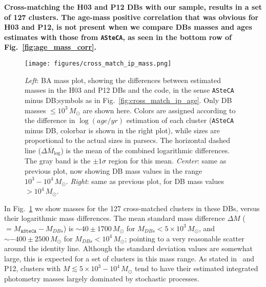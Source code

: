\documentclass{aa}
\begin{document}
\textbf{Cross-matching the H03 and P12 DBs with our sample, results in a
set of 127 clusters. The age-mass positive correlation that was obvious for H03
and P12, is not present when we compare DBs masses and ages estimates with
those from \texttt{ASteCA}, as seen in the bottom row of
Fig.~\ref{fig:age_mass_corr}.}
%
\begin{figure*}
\texttt{[image: figures/cross\_match\_ip\_mass.png]}
\caption{\emph{Left}: BA mass plot, showing the differences between estimated
masses in the H03 and P12 DBs and the code, in the sense \texttt{ASteCA} minus
DB;\@ symbols as in Fig.~\ref{fig:cross_match_ip_age}.
Only DB masses ${\le}10^3\,M_{\odot}$ are shown here.
Colors are assigned according to the difference in $\log(age/yr)$ estimation of
each cluster (\texttt{ASteCA} minus DB, colorbar is shown in the right plot),
while sizes are proportional to the actual sizes in parsecs.
The horizontal dashed line ($\overline{\Delta M_{\log}}$) is the mean of the
combined logarithmic differences. The gray band is the ${\pm}1\sigma$ region for
this mean.
\emph{Center}: same as previous plot, now showing DB mass values in the range
$10^3-10^4\,M_{\odot}$.
\emph{Right}: same as previous plot, for DB mass values ${>}10^4\,M_{\odot}$.
}
\label{fig:cross_match_ip_mass}
\end{figure*}
%
In Fig.~\ref{fig:cross_match_ip_mass} we show masses for the 127 cross-matched
clusters in these DBs, versus their logarithmic mass differences.
%
The mean standard mass difference $\Delta M$ (${=}M_{\mathtt{ASteCA}}-M_{DBs}$)
is ${\sim}40{\pm}1700\,M_{\odot}$ for $M_{DBs} {<}5{\times}10^3\,M_{\odot}$,
and ${\sim-}400{\pm}2500\,M_{\odot}$ for $M_{DBs} {<}10^4\,M_{\odot}$; pointing
to a very reasonable scatter around the identity line.
%
Although the standard deviation values are somewhat large, this is expected for
a set of clusters in this mass range. As stated in~\cite{Baumgardt_2013} and
P12, clusters with $M{\lesssim}5{\times}10^3 - 10^4\,M_{\odot}$ tend to have
their estimated integrated photometry masses largely dominated by
stochastic processes.
\end{document}
